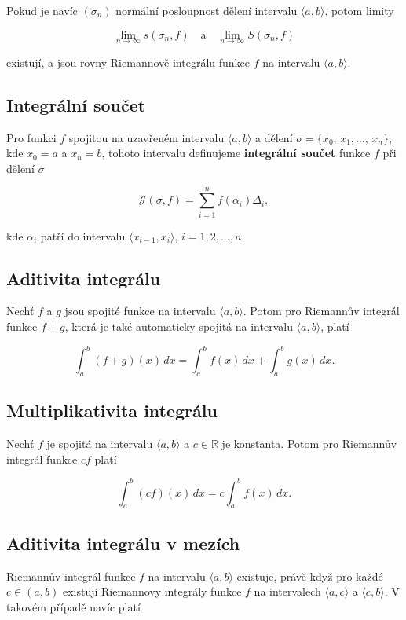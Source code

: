 Pokud je navíc $(\sigma_n)$ normální posloupnost dělení intervalu $\langle a,b
    \rangle$, potom limity

\[ \lim_{n\to\infty} s(\sigma_n, f) \quad \text{a} \quad \lim_{n\to\infty} S(\sigma_n,f) \]

\noindent existují, a jsou rovny Riemannově integrálu funkce $f$ na intervalu $\langle a,b \rangle$.
\subsection*{Integrální součet}

Pro funkci $f$ spojitou na uzavřeném intervalu $\langle a,b \rangle$ a dělení
$\sigma = \{x_0,\,x_1,\ldots,\,x_n\}$, kde $x_0 = a$ a $x_n = b$, tohoto
intervalu definujeme \textbf{integrální součet} funkce $f$ při dělení $\sigma$

\[ \mathcal{J}(\sigma,f) = \sum_{i=1}^n f(\alpha_i) \Delta_i, \]

\noindent kde $\alpha_i$ patří do intervalu $\langle x_{i-1}, x_i \rangle$,
$i=1,2,\ldots,n$.

\subsection*{Aditivita integrálu}

Nechť $f$ a $g$ jsou spojité funkce na intervalu $\langle a,b \rangle$. Potom
pro Riemannův integrál funkce $f+g$, která je také automaticky spojitá na
intervalu $\langle a,b \rangle$, platí

\[ \int_a^b (f+g)(x)\,dx = \int_a^b f(x)\,dx + \int_a^b g(x)\,dx. \]

\subsection*{Multiplikativita integrálu}

Nechť $f$ je spojitá na intervalu $\langle a,b \rangle$ a $c\in\mathbb{R}$ je
konstanta. Potom pro Riemannův integrál funkce $cf$ platí

\[ \int_a^b (cf)(x)\,dx = c \int_a^b f(x)\,dx. \]

\subsection*{Aditivita integrálu v mezích}

Riemannův integrál funkce $f$ na intervalu $\langle a, b \rangle$ existuje,
právě když pro každé $c \in (a,b)$ existují Riemannovy integrály funkce $f$ na
intervalech $\langle a, c \rangle$ a $\langle c, b \rangle$. V takovém případě
navíc platí

